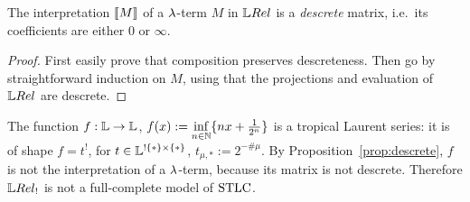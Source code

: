\begin{proposition}\label{prop:descrete}
 The interpretation $\llbracket M\rrbracket$ of a $\lambda$-term $M$ in $\LREL$ is a \emph{descrete} matrix, i.e.\ its coefficients are either $0$ or $\infty$.
\end{proposition}
\begin{proof}
 First easily prove that composition preserves descreteness.
 Then go by straightforward induction on $M$, using that the projections and evaluation of  $\LREL$ are descrete.
\end{proof}

\begin{example}
 The function $f:\mathbb{L}\to\mathbb{L}$, $f(x):=\inf\limits_{n\in\mathbb{N}}\{nx+\frac{1}{2^n}\}$ is a tropical Laurent series: it is of shape $f=t^!$, for $t\in\mathbb{L}^{!\{*\}\times\{*\}}$, $t_{\mu,*}:=2^{-\# \mu}$.
By Proposition~\ref{prop:descrete}, $f$ is not the interpretation of a $\lambda$-term, because its matrix is not descrete. Therefore $\LREL_!$ is not a full-complete model of $\mathrm{STLC}$.
\end{example}



